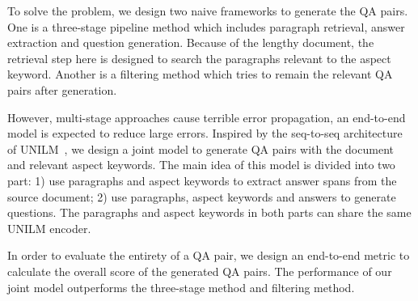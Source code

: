 
To solve the problem, we design two naive frameworks to generate the QA pairs. 
One is a three-stage pipeline method which includes paragraph retrieval, answer extraction and question generation. 
Because of the lengthy document, the retrieval step here is designed to search the paragraphs relevant to the aspect keyword.
Another is a filtering method which tries to remain the relevant QA pairs after generation.

However, multi-stage approaches cause terrible error propagation, an end-to-end model is expected to reduce large errors.
Inspired by the seq-to-seq architecture of UNILM~\cite{dong2019unified},  we design a joint model to generate QA pairs with the document and relevant aspect keywords.
The main idea of this model is divided into two part: 1) use paragraphs and aspect keywords to extract answer spans from the source document; 2) use paragraphs, aspect keywords and answers to generate questions. 
The paragraphs and aspect keywords in both parts can share the same UNILM encoder. 


In order to evaluate the entirety of a QA pair, we design an end-to-end metric to calculate the overall score of the generated QA pairs.
The performance of our joint model outperforms the three-stage method and filtering method.

